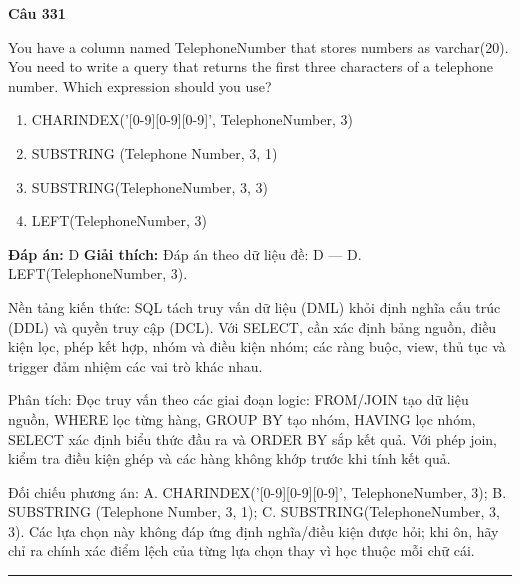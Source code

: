 \documentclass[11pt,a4paper]{article}
\newenvironment{question}[1]{%
  \par\vspace{1em}\noindent\textbf{\large Câu #1}\par\vspace{0.4em}
}{%
  \par\vspace{1em}\hrule\vspace{0.6em}
}
\newenvironment{choices}{%
  \begin{enumerate}[label=\textbf{\Alph*.},leftmargin=2.2em,itemsep=2pt,topsep=3pt]
}{%
  \end{enumerate}
}
\newcommand{\choice}{\item}
\begin{document}
\begin{question}{331}
You have a column named TelephoneNumber that stores numbers as varchar(20). You need to write a query that returns the first three characters of a telephone number. Which expression should you use?
\begin{choices}
\choice CHARINDEX('[0-9][0-9][0-9]', TelephoneNumber, 3)
\choice SUBSTRING (Telephone Number, 3, 1)
\choice SUBSTRING(TelephoneNumber, 3, 3)
\choice LEFT(TelephoneNumber, 3)
\end{choices}
\textbf{Đáp án:} D
\textbf{Giải thích:} Đáp án theo dữ liệu đề: D — D. LEFT(TelephoneNumber, 3).

Nền tảng kiến thức: SQL tách truy vấn dữ liệu (DML) khỏi định nghĩa cấu trúc (DDL) và quyền truy cập (DCL). Với SELECT, cần xác định bảng nguồn, điều kiện lọc, phép kết hợp, nhóm và điều kiện nhóm; các ràng buộc, view, thủ tục và trigger đảm nhiệm các vai trò khác nhau.

Phân tích: Đọc truy vấn theo các giai đoạn logic: FROM/JOIN tạo dữ liệu nguồn, WHERE lọc từng hàng, GROUP BY tạo nhóm, HAVING lọc nhóm, SELECT xác định biểu thức đầu ra và ORDER BY sắp kết quả. Với phép join, kiểm tra điều kiện ghép và các hàng không khớp trước khi tính kết quả.

Đối chiếu phương án: A. CHARINDEX('[0-9][0-9][0-9]', TelephoneNumber, 3); B. SUBSTRING (Telephone Number, 3, 1); C. SUBSTRING(TelephoneNumber, 3, 3). Các lựa chọn này không đáp ứng định nghĩa/điều kiện được hỏi; khi ôn, hãy chỉ ra chính xác điểm lệch của từng lựa chọn thay vì học thuộc mỗi chữ cái.
\end{question}
\end{document}
